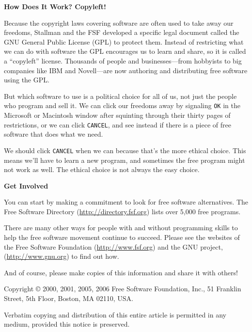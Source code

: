 \documentclass[twoside,12pt]{article}
\begin{document}
\begin{center}
{\Large\bf How Does It Work? Copyleft!}
\end{center}

Because the copyright laws covering software are often used to take away our
freedoms, Stallman and the FSF developed a specific legal document called the
GNU General Public License (GPL) to protect them. Instead of restricting what
we can do with software the GPL encourages us to learn and share, so it is
called a ``copyleft'' license. Thousands of people and businesses---from
hobbyists to big companies like IBM and Novell---are now authoring and
distributing free software using the GPL.

But which software to use is a political choice for all of us, not just the
people who program and sell it. We can click our freedoms away by signaling
{\tt OK} in the Microsoft or Macintosh window after squinting through their
thirty pages of restrictions, or we can click {\tt CANCEL}, and see instead if
there is a piece of free software that does what we need.

We should click {\tt CANCEL} when we can because that's the more ethical choice.
This means we'll have to learn a new program, and sometimes the free program
might not work as well. The ethical choice is not always the easy choice.

\begin{center}
{\Large\bf Get Involved}
\end{center}

You can start by making a commitment to look for free software alternatives.
The Free Software Directory (\url{http://directory.fsf.org}) lists over 5,000 free
programs.

There are many other ways for people with and without programming skills to
help the free software movement continue to succeed. Please see the websites of
the Free Software Foundation (\url{http://www.fsf.org}) and the GNU project,
(\url{http://www.gnu.org}) to find out how.

And of course, please make copies of this information and share it with
others!

\vspace{0.3in}

{\small

\noindent Copyright \copyright\/ 2000, 2001, 2005, 2006 Free Software Foundation, Inc., 51
Franklin Street, 5th Floor, Boston, MA 02110, USA.

Verbatim copying and distribution of this entire article is permitted
in any medium, provided this notice is preserved.
}
\end{document}
